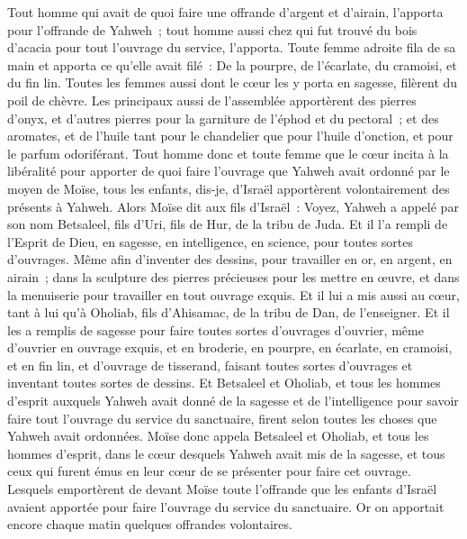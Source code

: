 \begin{multicols}{2}
Tout homme qui avait de quoi faire une offrande d'argent et d'airain, l'apporta pour l'offrande de Yahweh~; tout homme aussi chez qui fut trouvé du bois d'acacia pour tout l'ouvrage du service, l'apporta.
Toute femme adroite fila de sa main et apporta ce qu'elle avait filé~: De la pourpre, de l'écarlate, du cramoisi, et du fin lin.
Toutes les femmes aussi dont le cœur les y porta en sagesse, filèrent du poil de chèvre.
Les principaux aussi de l'assemblée apportèrent des pierres d'onyx, et d'autres pierres pour la garniture de l'éphod et du pectoral~;
et des aromates, et de l'huile tant pour le chandelier que pour l'huile d'onction, et pour le parfum odoriférant.
Tout homme donc et toute femme que le cœur incita à la libéralité pour apporter de quoi faire l'ouvrage que Yahweh avait ordonné par le moyen de Moïse, tous les enfants, dis-je, d'Israël apportèrent volontairement des présents à Yahweh.
Alors Moïse dit aux fils d'Israël~: Voyez, Yahweh a appelé par son nom Betsaleel, fils d'Uri, fils de Hur, de la tribu de Juda.
Et il l'a rempli de l'Esprit de Dieu, en sagesse, en intelligence, en science, pour toutes sortes d'ouvrages.
Même afin d'inventer des dessins, pour travailler en or, en argent, en airain~;
dans la sculpture des pierres précieuses pour les mettre en œuvre, et dans la menuiserie pour travailler en tout ouvrage exquis.
Et il lui a mis aussi au cœur, tant à lui qu'à Oholiab, fils d'Ahisamac, de la tribu de Dan, de l'enseigner.
Et il les a remplis de sagesse pour faire toutes sortes d'ouvrages d'ouvrier, même d'ouvrier en ouvrage exquis, et en broderie, en pourpre, en écarlate, en cramoisi, et en fin lin, et d'ouvrage de tisserand, faisant toutes sortes d'ouvrages et inventant toutes sortes de dessins.
\VerseOne{}Et Betsaleel et Oholiab, et tous les hommes d'esprit auxquels Yahweh avait donné de la sagesse et de l'intelligence pour savoir faire tout l'ouvrage du service du sanctuaire, firent selon toutes les choses que Yahweh avait ordonnées.
Moïse donc appela Betsaleel et Oholiab, et tous les hommes d'esprit, dans le cœur desquels Yahweh avait mis de la sagesse, et tous ceux qui furent émus en leur cœur de se présenter pour faire cet ouvrage.
Lesquels emportèrent de devant Moïse toute l'offrande que les enfants d'Israël avaient apportée pour faire l'ouvrage du service du sanctuaire. Or on apportait encore chaque matin quelques offrandes volontaires.

\end{multicols}
